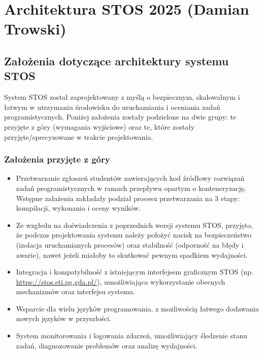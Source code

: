\documentclass[12pt,a4paper]{article}
\begin{document}
\tableofcontents
\clearpage
{}















\newpage
\section{Architektura STOS 2025 (Damian Trowski)}
\subsection{Założenia dotyczące architektury systemu STOS}
System STOS został zaprojektowany z myślą o bezpiecznym, skalowalnym i łatwym w utrzymaniu środowisku do uruchamiania i oceniania zadań programistycznych. Poniżej założenia zostały podzielone na dwie grupy: te przyjęte z góry (wymagania wyjściowe) oraz te, które zostały przyjęte/sprecyzowane w trakcie projektowania.

\subsubsection*{Założenia przyjęte z góry}
\begin{itemize}
    \item Przetwarzanie zgłoszeń studentów zawierających kod źródłowy rozwiązań zadań programistycznych w ramach przepływu opartym o konteneryzację. Wstępne załażenia zakładały podział procesu przetwarzania na 3 etapy: kompilacji, wykonania i oceny wyników.
    \item Ze wzgłedu na doświadczenia z poprzednich wersji systemu STOS, przyjęto, że podczas projektowania systemu należy położyć nacisk na bezpieczeństwo (izolacja uruchamianych procesów) oraz stabilność (odporność na błędy i awarie), nawet jeżeli miałoby to skutkować pewnym spadkiem wydajności.
    \item Integracja i kompatybilność z istniejącym interfejsem graficznym STOS (np. \url{https://stos.eti.pg.gda.pl/}), umożliwiająca wykorzystanie obecnych mechanizmów oraz interfejsu systemu.
    \item Wsparcie dla wielu języków programowania, z możliwością łatwego dodawania nowych języków w przyszłości.
    \item System monitorowania i logowania zdarzeń, umożliwiający śledzenie stanu zadań, diagnozowanie problemów oraz analizę wydajności.
\end{itemize}
\end{document}
